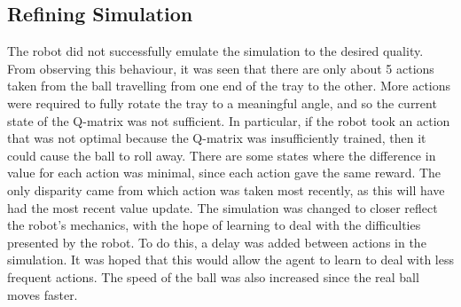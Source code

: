 \documentclass[12pt,a4paper]{article}
\begin{document}
\subsection{Refining Simulation}
The robot did not successfully emulate the simulation to the desired quality. From observing this behaviour, it was seen that there are only about 5 actions taken from the ball travelling from one end of the tray to the other. More actions were required to fully rotate the tray to a meaningful angle, and so the current state of the Q-matrix was not sufficient. In particular, if the robot took an action that was not optimal because the Q-matrix was insufficiently trained, then it could cause the ball to roll away. There are some states where the difference in value for each action was minimal, since each action gave the same reward. The only disparity came from which action was taken most recently, as this will have had the most recent value update. The simulation was changed to closer reflect the robot's mechanics, with the hope of learning to deal with the difficulties presented by the robot. To do this, a delay was added between actions in the simulation. It was hoped that this would allow the agent to learn to deal with less frequent actions. The speed of the ball was also increased since the real ball moves faster.


\end{document}
